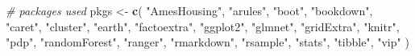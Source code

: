 \documentclass[]{book}
\newenvironment{Shaded}{\begin{snugshade}}{\end{snugshade}}
\newcommand{\CommentTok}[1]{\textcolor[rgb]{0.56,0.35,0.01}{\textit{#1}}}
\newcommand{\KeywordTok}[1]{\textcolor[rgb]{0.13,0.29,0.53}{\textbf{#1}}}
\newcommand{\NormalTok}[1]{#1}
\newcommand{\StringTok}[1]{\textcolor[rgb]{0.31,0.60,0.02}{#1}}
\theoremstyle{definition}
\theoremstyle{definition}
\theoremstyle{definition}
\theoremstyle{remark}
\begin{document}
\begin{Shaded}
\begin{Highlighting}[]
\CommentTok{# packages used}
\NormalTok{pkgs <-}\StringTok{ }\KeywordTok{c}\NormalTok{(}
  \StringTok{"AmesHousing"}\NormalTok{,}
  \StringTok{"arules"}\NormalTok{,}
  \StringTok{"boot"}\NormalTok{, }
  \StringTok{"bookdown"}\NormalTok{,}
  \StringTok{"caret"}\NormalTok{,}
  \StringTok{"cluster"}\NormalTok{,}
  \StringTok{"earth"}\NormalTok{,}
  \StringTok{"factoextra"}\NormalTok{,}
  \StringTok{"ggplot2"}\NormalTok{,}
  \StringTok{"glmnet"}\NormalTok{,}
  \StringTok{"gridExtra"}\NormalTok{,}
  \StringTok{"knitr"}\NormalTok{, }
  \StringTok{"pdp"}\NormalTok{,}
  \StringTok{"randomForest"}\NormalTok{,}
  \StringTok{"ranger"}\NormalTok{,}
  \StringTok{"rmarkdown"}\NormalTok{,}
  \StringTok{"rsample"}\NormalTok{,}
  \StringTok{"stats"}\NormalTok{,}
  \StringTok{"tibble"}\NormalTok{,}
  \StringTok{"vip"}
\NormalTok{)}


\end{Highlighting}
\end{Shaded}
\end{document}

